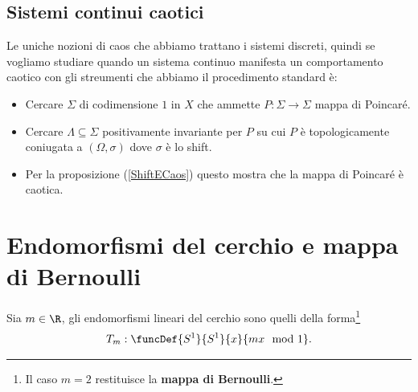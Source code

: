 \subsection{Sistemi continui caotici}
Le uniche nozioni di caos che abbiamo trattano i sistemi discreti, quindi se vogliamo studiare quando un sistema continuo manifesta un comportamento caotico con gli streumenti che abbiamo il procedimento standard \`e:
\begin{itemize}
\item Cercare $\Sigma$ di codimensione $1$ in $X$ che ammette $P:\Sigma\to\Sigma$ mappa di Poincar\'e.
\item Cercare $\Lambda\subseteq \Sigma$ positivamente invariante per $P$ su cui $P$ \`e topologicamente coniugata a $(\Omega,\sigma)$ dove $\sigma$ \`e lo shift.
\item Per la proposizione (\ref{ShiftECaos}) questo mostra che la mappa di Poincar\'e \`e caotica.
\end{itemize}


\section{Endomorfismi del cerchio e mappa di Bernoulli}
\begin{definition}
Sia $m\in\R$, gli endomorfismi lineari del cerchio sono quelli della forma\footnote{Il caso $m=2$ restituisce la \textbf{mappa di Bernoulli}.}
\[T_m:\funcDef{S^1}{S^1}{x}{mx\mod 1}.\]
\end{definition}

